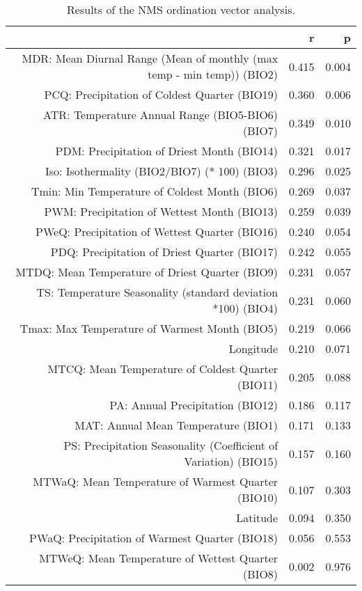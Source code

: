 \begin{table}[ht]
\centering
\begin{tabular}{rrr}
  \hline
 & r & p \\ 
  \hline
MDR: Mean Diurnal Range (Mean of monthly (max temp - min temp)) (BIO2) & 0.415 & 0.004 \\ 
  PCQ: Precipitation of Coldest Quarter (BIO19) & 0.360 & 0.006 \\ 
  ATR: Temperature Annual Range (BIO5-BIO6) (BIO7) & 0.349 & 0.010 \\ 
  PDM: Precipitation of Driest Month (BIO14) & 0.321 & 0.017 \\ 
  Iso: Isothermality (BIO2/BIO7) (* 100) (BIO3) & 0.296 & 0.025 \\ 
  Tmin: Min Temperature of Coldest Month (BIO6) & 0.269 & 0.037 \\ 
  PWM: Precipitation of Wettest Month (BIO13) & 0.259 & 0.039 \\ 
  PWeQ: Precipitation of Wettest Quarter (BIO16) & 0.240 & 0.054 \\ 
  PDQ: Precipitation of Driest Quarter (BIO17) & 0.242 & 0.055 \\ 
  MTDQ: Mean Temperature of Driest Quarter (BIO9) & 0.231 & 0.057 \\ 
  TS: Temperature Seasonality (standard deviation *100) (BIO4) & 0.231 & 0.060 \\ 
  Tmax: Max Temperature of Warmest Month (BIO5) & 0.219 & 0.066 \\ 
  Longitude & 0.210 & 0.071 \\ 
  MTCQ: Mean Temperature of Coldest Quarter (BIO11) & 0.205 & 0.088 \\ 
  PA: Annual Precipitation (BIO12) & 0.186 & 0.117 \\ 
  MAT: Annual Mean Temperature (BIO1) & 0.171 & 0.133 \\ 
  PS: Precipitation Seasonality (Coefficient of Variation) (BIO15) & 0.157 & 0.160 \\ 
  MTWaQ: Mean Temperature of Warmest Quarter (BIO10) & 0.107 & 0.303 \\ 
  Latitude & 0.094 & 0.350 \\ 
  PWaQ: Precipitation of Warmest Quarter (BIO18) & 0.056 & 0.553 \\ 
  MTWeQ: Mean Temperature of Wettest Quarter (BIO8) & 0.002 & 0.976 \\ 
   \hline
\end{tabular}
\caption{Results of the NMS ordination vector analysis.} 
\label{tab:wc_vec}
\end{table}
